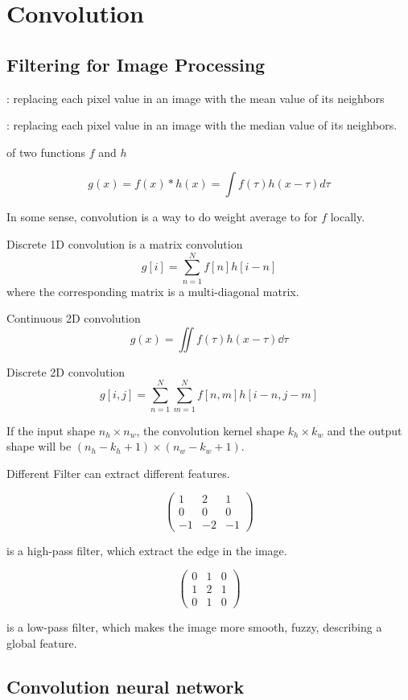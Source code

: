 \section{Convolution}
\subsection{Filtering for Image Processing}
: replacing each pixel value in an image with the mean value of its neighbors

: replacing each pixel value in an image with the median value of its neighbors.

 of two functions  $ f $ and  $ h $

\[g(x)=f(x)*h(x)=\int f(\tau)h(x-\tau)d\tau\]  

In some sense, convolution is a way to do weight average to for  $ f $ locally.

Discrete 1D convolution is a matrix convolution 
\[g[i]=\sum_{n=1}^N f[n]h[i-n]\]
where the corresponding matrix is a multi-diagonal matrix.

Continuous 2D convolution 
\[g(x)=\iint  f(\tau)h(x-\tau)\dd\tau\]

Discrete 2D convolution
\[g[i,j]=\sum_{n=1}^N \sum_{m=1}^N f[n,m]h[i-n,j-m]\]

If the input shape  $ n_h\times n_w $, the convolution kernel shape  $ k_h\times k_w $ and the output shape will be  $ (n_h-k_h+1)\times (n_w-k_w+1) $.

Different Filter can extract different features.

\[\begin{pmatrix}
    1&2&1\\
    0&0&0\\
    -1&-2&-1
\end{pmatrix}\]

is a high-pass filter, which extract the edge in the image.

\[\begin{pmatrix}
    0&1&0\\
    1&2&1\\
    0&1&0
\end{pmatrix}\]

is a low-pass filter, which makes the image more smooth, \ie fuzzy, describing a global feature.




\subsection{Convolution neural network}

